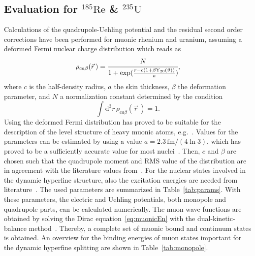 \subsection{Evaluation for $^{185}\text{Re}$ \& $^{235}\text{U}$}
Calculations of the quadrupole-Uehling potential and the residual second order corrections have been performed for muonic rhenium and uranium, assuming a deformed Fermi nuclear charge distribution which reads as
\begin{equation}
\rho_{ca\beta}(\vec{r}\,)=\cfrac{N}{1+\exp (\frac{r-c(1+\beta \text{Y}_{20}(\vartheta))}{a})},
\label{eq:deffermi_2}
\end{equation}
where $c$ is the half-density radius, $a$ the skin thickness, $\beta$ the deformation parameter, and $N$ a normalization constant determined by the condition
\begin{equation}
\int \text{d}^3r\, \rho_{ca\beta}(\vec{r}\,)=1.
\end{equation}
Using the deformed Fermi distribution has proved to be suitable for the description of the level structure of heavy muonic atoms, e.g.~\cite{hitlin1970,tanaka1984,tanaka1984_2}.
Values for the parameters can be estimated by using a value ${a}{=}{2.3\,\text{fm}/(4\ln 3)}$, which has proved to be a sufficiently accurate value for most nuclei~\cite{Beier2000}. Then, $c$ and $\beta$ are chosen such that the quadrupole moment and RMS value of the distribution are in agreement with the literature values from~\cite{Angeli2013,Stone2005}. For the nuclear states involved in the dynamic hyperfine structure, also the excitation energies are needed from literature~\cite{ENSDF}. The used parameters are summarized in Table~\ref{tab:params}.
With these parameters, the electric and Uehling potentials, both monopole and quadrupole parts, can be calculated numerically. The muon wave functions are obtained by solving the Dirac equation~\eqref{eq:muonicEn} with the dual-kinetic-balance method~\cite{Shabaev2004}. Thereby, a complete set of muonic bound and continuum states is obtained. An overview for the binding energies of muon states important for the dynamic hyperfine splitting are shown in Table~\ref{tab:monopole}.

